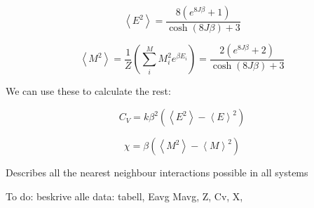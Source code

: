 \[
\left< E^2 \right> = \frac{8 \left( e^{8J\beta } + 1\right) }{\cosh (8J\beta ) + 3}
\]


\[
\left< M^2 \right> = \frac{1}{Z} \left( \sum_i^M M_i^2 e^{\beta E_i}\right) = \frac{2 \left( e^{8J\beta } + 2\right) }{\cosh (8J\beta ) + 3}
\]

We can use these to calculate the rest:

\[
C_V = k \beta^2\left( \left< E^2\right> - \left< E\right>^2 \right)
\]

\[
\chi = \beta \left( \left< M^2\right> - \left< M\right>^2\right)
\]



Describes all the nearest neighbour interactions possible in all systems


To do:  beskrive alle data: tabell,  Eavg Mavg, Z, Cv, X, 